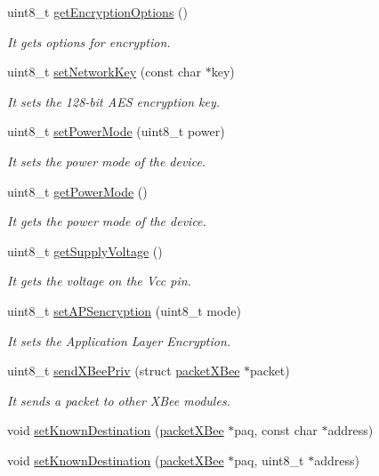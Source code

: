 \begin{DoxyCompactItemize}
uint8\+\_\+t \hyperlink{class_wasp_x_bee_z_b_a97dd852a026ff78e4363057b93fc3eba}{get\+Encryption\+Options} ()
\begin{DoxyCompactList}\small\item\em It gets options for encryption. \end{DoxyCompactList}\item 
uint8\+\_\+t \hyperlink{class_wasp_x_bee_z_b_a06504b4f6c7c9c701ecaf031f0e67e4c}{set\+Network\+Key} (const char $\ast$key)
\begin{DoxyCompactList}\small\item\em It sets the 128-\/bit A\+ES encryption key. \end{DoxyCompactList}\item 
uint8\+\_\+t \hyperlink{class_wasp_x_bee_z_b_a9294555b860999c770b4a64de9f9bd9a}{set\+Power\+Mode} (uint8\+\_\+t power)
\begin{DoxyCompactList}\small\item\em It sets the power mode of the device. \end{DoxyCompactList}\item 
uint8\+\_\+t \hyperlink{class_wasp_x_bee_z_b_aa48a068d83c9a36b9facc66ce842b88c}{get\+Power\+Mode} ()
\begin{DoxyCompactList}\small\item\em It gets the power mode of the device. \end{DoxyCompactList}\item 
uint8\+\_\+t \hyperlink{class_wasp_x_bee_z_b_a41f1c1f8f3a07179d593d38dafc38e5c}{get\+Supply\+Voltage} ()
\begin{DoxyCompactList}\small\item\em It gets the voltage on the Vcc pin. \end{DoxyCompactList}\item 
uint8\+\_\+t \hyperlink{class_wasp_x_bee_z_b_ad109ebed041cadba7747660e5bf3b7c8}{set\+A\+P\+Sencryption} (uint8\+\_\+t mode)
\begin{DoxyCompactList}\small\item\em It sets the Application Layer Encryption. \end{DoxyCompactList}\item 
uint8\+\_\+t \hyperlink{class_wasp_x_bee_z_b_a50375e7d9ab3bba2a7eec41eff8bb4e6}{send\+X\+Bee\+Priv} (struct \hyperlink{structpacket_x_bee}{packet\+X\+Bee} $\ast$packet)
\begin{DoxyCompactList}\small\item\em It sends a packet to other X\+Bee modules. \end{DoxyCompactList}\item 
void \hyperlink{class_wasp_x_bee_z_b_a92e2276d07ed342ec44e0b8f1305e9b6}{set\+Known\+Destination} (\hyperlink{structpacket_x_bee}{packet\+X\+Bee} $\ast$paq, const char $\ast$address)
\item 
void \hyperlink{class_wasp_x_bee_z_b_a10e0ee0ca5ac913b03fc8a4198a1814d}{set\+Known\+Destination} (\hyperlink{structpacket_x_bee}{packet\+X\+Bee} $\ast$paq, uint8\+\_\+t $\ast$address)
\end{DoxyCompactItemize}
